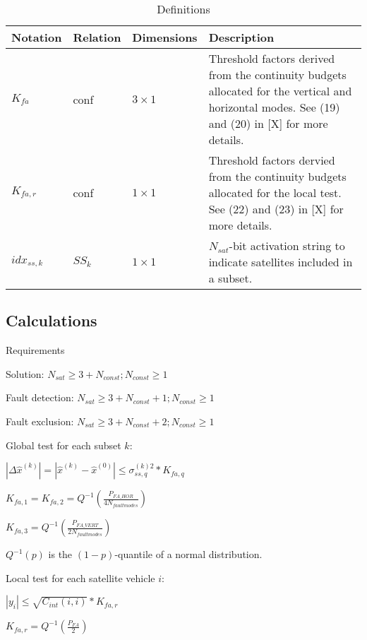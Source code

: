 \documentclass[11pt]{article}
\begin{document}
\begin{table}[htbp] \centering
  \caption{Definitions}
  \begin{tabular}{|m{2cm}|m{2cm}|m{2cm}|m{7cm}|}
    \hline
    \textbf{Notation} & \textbf{Relation} & \textbf{Dimensions} & \textbf{Description}\\ \hline
    $K_{fa}$ & conf & $3 \times 1$ & Threshold factors derived from the continuity budgets allocated for the vertical and horizontal modes. See (19) and (20) in [X] for more details.\\ \hline
    $K_{fa,r}$ & conf & $1 \times 1$ & Threshold factors dervied from the continuity budgets allocated for the local test. See (22) and (23) in [X] for more details.\\ \hline
    $idx_{ss,k}$ & $SS_k$ & $1 \times 1$ & $N_{sat}$-bit activation string to indicate satellites included in a subset.\\ \hline
  \end{tabular}
\end{table}

\subsection{Calculations}

Requirements

Solution: $N_{sat} \ge 3 + N_{const}; N_{const} \ge 1$

Fault detection: $N_{sat} \ge 3 + N_{const} + 1; N_{const} \ge 1$

Fault exclusion: $N_{sat} \ge 3 + N_{const} + 2; N_{const} \ge 1$

Global test for each subset $k$:

$|\Delta \hat{x}^{(k)}| = |\hat{x}^{(k)} - \hat{x}^{(0)}| \le \sigma_{ss,q}^{(k)2} * K_{fa,q}$

$K_{fa,1} = K_{fa,2} = Q^{-1}(\frac{P_{FA\_HOR}}{4N_{fault modes}})$

$K_{fa,3} = Q^{-1}(\frac{P_{FA\_VERT}}{2N_{fault modes}})$

$Q^{-1}(p)$ is the $(1-p)$-quantile of a normal distribution.

Local test for each satellite vehicle $i$:

$|y_i| \le \sqrt{C_{int}(i,i)} * K_{fa,r}$

$K_{fa,r} = Q^{-1}(\frac{P_{FA}}{2})$
\end{document}
